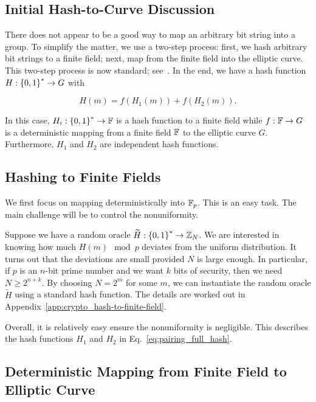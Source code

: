 \subsection{Initial Hash-to-Curve Discussion}

There does not appear to be a good way to map an arbitrary bit string
into a \gls{group}.
To simplify the matter, we use a two-step process:
first, we hash arbitrary bit strings to a \gls{finite field};
next, map from the \gls{finite field} into the \gls{elliptic curve}.
This two-step process is now standard;
see~\cite{brier2010efficient,fouque2012indifferentiable,BonehWahby2019}.
In the end, we have a \gls{hash function} $H:\left\{ 0,1 \right\}^{*}\to G$
with

\begin{equation}
    H(m) = f(H_{1}(m)) + f(H_{2}(m)).
    \label{eq:pairing_full_hash}
\end{equation}

\noindent
In this case, $H_{i}:\left\{ 0,1 \right\}^{*}\to\mathbb{F}$ is a \gls{hash function}
to a \gls{finite field} while $f:\mathbb{F}\to G$ is a deterministic mapping
from a \gls{finite field} $\mathbb{F}$ to the \gls{elliptic curve} $G$.
Furthermore, $H_{1}$ and $H_{2}$ are independent \glspl{hash function}.

\subsection{Hashing to Finite Fields}

We first focus on mapping deterministically into $\mathbb{F}_{p}$.
This is an easy task.
The main challenge will be to control the nonuniformity.

Suppose we have a \gls{random oracle} $\widetilde{H}:\left\{ 0,1 \right\}^{*}\to\mathbb{Z}_{N}$.
We are interested in knowing how much $H(m) \mod p$
deviates from the uniform distribution.
It turns out that the deviations are small provided $N$ is large enough.
In particular, if $p$ is an $n$-bit prime number
and we want $k$ bits of security,
then we need $N\ge2^{n+k}$.
By choosing $N = 2^{m}$ for some $m$,
we can instantiate the \gls{random oracle} $\widetilde{H}$
using a standard \gls{hash function}.
The details are worked out in Appendix~\ref{app:crypto_hash-to-finite-field}.

Overall, it is relatively easy ensure the nonuniformity is negligible.
This describes the \glspl{hash function} $H_{1}$ and $H_{2}$
in Eq.~\eqref{eq:pairing_full_hash}.

\subsection{Deterministic Mapping from Finite Field to Elliptic Curve}

